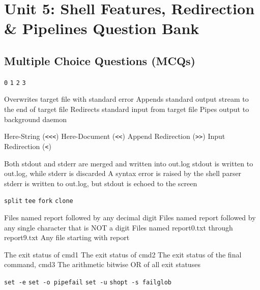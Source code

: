 \chapter{Unit 5: Shell Features, Redirection \& Pipelines Question Bank}

\section{Multiple Choice Questions (MCQs)}

{\texttt{0}}
{\texttt{1}}
{\texttt{2}}
{\texttt{3}}

{Overwrites target file with standard error}
{Appends standard output stream to the end of target file}
{Redirects standard input from target file}
{Pipes output to background daemon}

{Here-String (\texttt{<<<})}
{Here-Document (\texttt{<<})}
{Append Redirection (\texttt{>>})}
{Input Redirection (\texttt{<})}

{Both stdout and stderr are merged and written into out.log}
{stdout is written to out.log, while stderr is discarded}
{A syntax error is raised by the shell parser}
{stderr is written to out.log, but stdout is echoed to the screen}

{\texttt{split}}
{\texttt{tee}}
{\texttt{fork}}
{\texttt{clone}}

{Files named report followed by any decimal digit}
{Files named report followed by any single character that is NOT a digit}
{Files named report0.txt through report9.txt}
{Any file starting with report}

{The exit status of cmd1}
{The exit status of cmd2}
{The exit status of the final command, cmd3}
{The arithmetic bitwise OR of all exit statuses}

{\texttt{set -e}}
{\texttt{set -o pipefail}}
{\texttt{set -u}}
{\texttt{shopt -s failglob}}

